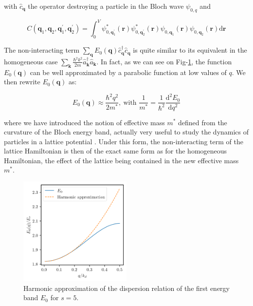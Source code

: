 \noindent with $\hat{c}_{\bm{q}}$ the operator destroying a particle in the Bloch wave $\psi_{0,q}$ and 


\begin{equation}
    C\left(\bm{q}_{1}, \bm{q}_{2}, \bm{q}_{1}^{\prime}, \bm{q}_{2}^{\prime}\right)=\int_{0}^{V} \psi_{0, \bm{q}_{1}^{\prime}}^{*}(\bm{r}) \psi_{0, \bm{q}_{2}^{\prime}}^{*}(\bm{r}) \psi_{0, \bm{q}_{1}}(\bm{r}) \psi_{0, \bm{\bm{q}}_{2}}(\bm{r}) \mathrm{d} \bm{r}
\end{equation}

The non-interacting term $\sum_{\bm{q}} E_{0}(\bm{q}) \hat{c}_{\bm{q}}^{\dagger} \hat{c}_{\bm{q}}$ is quite similar to its equivalent in the homogeneous case $\sum_{\bm{k}}\frac{\hbar^2 k^2}{2m} \hat{a}^{\dagger}_{\bm{k}}  \hat{a}_{\bm{k}}$. In fact, as we can see on Fig-\ref{fig:dispersion_relation_harmonic}, the function $E_{0}(\bm{q})$ can be well approximated by a parabolic function at low values of $q$. We then rewrite $E_{0}(\bm{q})$ as:

\begin{equation}
    E_{0}(\bm{q}) \approx \frac{\hbar^2 q^2}{2 m^*}, \ \text{with } \frac{1}{m^*} = \frac{1}{\hbar^2} \frac{\mathrm{d}^2 E_0 }{\mathrm{d}q^2}
\end{equation}

\noindent where we have introduced the notion of effective mass $m^*$ defined from the curvature of the Bloch energy band, actually very useful to study the dynamics of particles in a lattice potential \cite{kramer2002macroscopic,dalibard2013cages}. Under this form, the non-interacting term of the lattice Hamiltonian is then of the exact same form as for the homogeneous Hamiltonian, the effect of the lattice being contained in the new effective mass $m^*$.

\begin{figure}
    \centering
    \includegraphics[width=0.5\textwidth]{Fig/Chapter2/dispersion_relation_harmonic.png}
    \caption{Harmonic approximation of the dispersion relation of the first energy band $E_0$ for $s=5$.}
    \label{fig:dispersion_relation_harmonic}
\end{figure}

